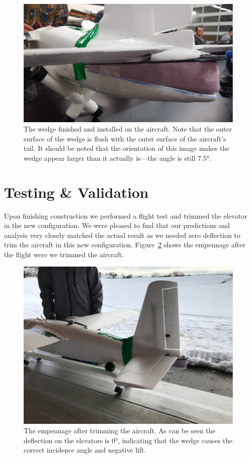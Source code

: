 \documentclass[]{auvsi_doc}
\begin{document}
\begin{figure}[h]
\includegraphics[width=\textwidth]{./figs/tailwedge.jpg}
\caption{The wedge finished and installed on the aircraft. Note that the outer surface of the wedge is flush with the outer surface of the aircraft's tail. It should be noted that the orientation of this image makes the wedge appear larger than it actually is---the angle is still 7.5°.}
\label{wedge}
\end{figure}

\section{Testing \& Validation}

Upon finishing construction we performed a flight test and trimmed the elevator in the new configuration. We were pleased to find that our predictions and analysis very closely matched the actual result as we needed zero deflection to trim the aircraft in this new configuration. Figure~\ref{deflect} shows the empennage after the flight were we trimmed the aircraft.

\begin{figure}[h]
\includegraphics[width=\textwidth]{./figs/empennage.jpg}
\caption{The empennage after trimming the aircraft. As can be seen the deflection on the elevators is 0°, indicating that the wedge causes the correct incidence angle and negative lift.}
\label{deflect}
\end{figure}
\end{document}
